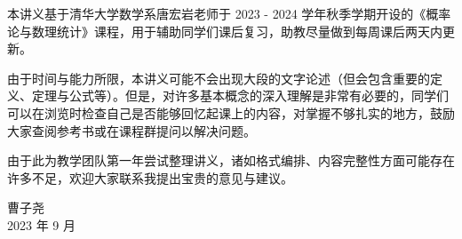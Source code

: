 \documentclass[main.tex]{subfiles}
\begin{document}
本讲义基于清华大学数学系唐宏岩老师于 2023 - 2024 学年秋季学期开设的《概率论与数理统计》课程，用于辅助同学们课后复习，助教尽量做到每周课后两天内更新。

由于时间与能力所限，本讲义可能不会出现大段的文字论述（但会包含重要的定义、定理与公式等）。但是，对许多基本概念的深入理解是非常有必要的，同学们可以在浏览时检查自己是否能够回忆起课上的内容，对掌握不够扎实的地方，鼓励大家查阅参考书或在课程群提问以解决问题。

由于此为教学团队第一年尝试整理讲义，诸如格式编排、内容完整性方面可能存在许多不足，欢迎大家联系我提出宝贵的意见与建议。

\begin{flushright}
    曹子尧\\
    2023 年 9 月
\end{flushright}
\end{document}

